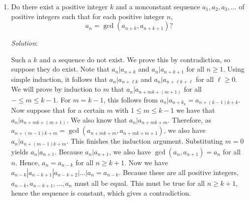 \documentclass{article}
\begin{document}
\begin{enumerate}[1.]
\item %
Do there exist a positive integer $k$ and a nonconstant sequence $a_1, a_2, a_3, \dotsc$ of positive integers such that for each positive integer $n$,
\[ a_n = \gcd(a_{n+k},a_{n+k+1})? \]

\textit{Solution}:

Such a $k$ and a sequence do not exist. We prove this by contradiction, so suppose they do exist. Note that $a_n | a_{n+k}$ and $a_n | a_{n+k+1}$ for all $n \ge 1$. Using simple induction, it follows that $a_n | a_{n+\ell k}$ and $a_n | a_{n+\ell k+ \ell}$ for all $\ell \ge 0$. We will prove by induction to $m$ that $ a_n | a_{n+mk+(m+1)}$ for all $- \le m \le k - 1$. For $m = k - 1$, this follows from $a_n | a_{n+k_k} =a_{n+(k-1)k+k}$. Now suppose that for a certain $m$ with $1 \le m \le k - 1$ we have that $a_n | a_{n+mk+(m+1)}$. We also know that $a_n | a_{n+mk+m}$. Therefore, as $a_{n+(m-1)k+m} = \gcd(a_{n+mk+m}, a_{n+mk+m+1})$, we also have $a_n | a_{n+(m-1)k+m}$. This finishes the induction argument. Substituting $m = 0$ yields $a_n | a_{n+1}$. Because $a_n | a_{n+1}$, we also have $\gcd(a_n, a_{n+1}) = a_n$ for all $n$. Hence, $a_n = a_{n-k}$ for all $n \ge k + 1$. Now we have $a_{n-k} | a_{n-k+1} | a_{n-k+2} | . . . |a_n = a_{n-k}$. Because these are all positive integers, $a_{n-k}, a_{n-k+1}, . . . , a_n$ must all be equal. This must be true for all $n \ge k + 1$, hence the sequence is constant, which gives a contradiction.


\end{enumerate}
\end{document}
